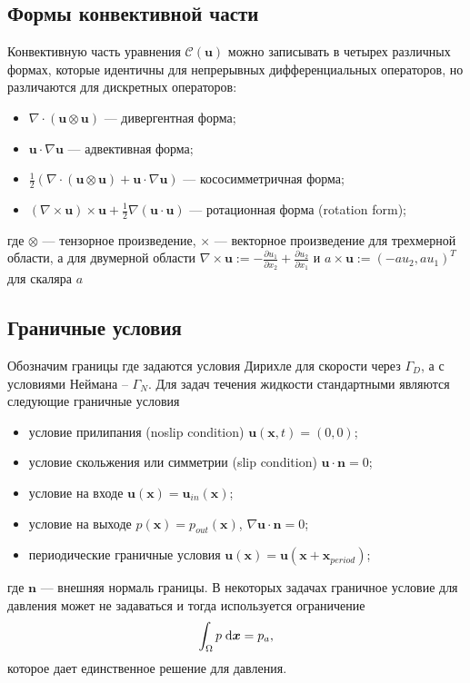 \documentclass[a4paper,10pt]{report}
\begin{document}
\subsection{Формы конвективной части}

Конвективную часть уравнения $\mathcal{C}(\bm{u})$ можно записывать в четырех различных формах, которые идентичны для непрерывных дифференциальных операторов, но различаются для дискретных операторов:
\begin{itemize}
\item $\nabla \cdot \left(\bm{u} \otimes \bm{u} \right)$ --- дивергентная форма;
\item $\bm{u} \cdot \nabla \bm{u}$ --- адвективная форма;
\item $\frac{1}{2}\left(\nabla \cdot \left(\bm{u} \otimes \bm{u} \right) + \bm{u} \cdot \nabla \bm{u} \right)$ --- кососимметричная форма;
\item $\left( \nabla \times \bm{u} \right) \times \bm{u} + \frac{1}{2} \nabla \left(\bm{u} \cdot \bm{u} \right) $ --- ротационная форма (rotation form);
\end{itemize}
где $\otimes$ --- тензорное произведение, $\times$ --- векторное произведение для трехмерной области, а для двумерной области $\nabla \times \bm{u} := -\frac{\partial u_1}{\partial x_2} + \frac{\partial u_2}{\partial x_1}$ и $a \times \bm{u} := (-a u_2, a u_1)^T$ для скаляра $a$


\subsection{Граничные условия}
Обозначим границы где задаются условия Дирихле для скорости через $\Gamma_D$, а с условиями Неймана -- $\Gamma_N$. Для задач течения жидкости стандартными являются следующие граничные условия
\begin{itemize}
\item условие прилипания (noslip condition) $\bm{u}(\bm{x}, t) = (0, 0)$;
\item условие скольжения или симметрии (slip condition) $\bm{u} \cdot \bm{n} = 0$;
\item условие на входе $\bm{u}(\bm{x}) = \bm{u}_{in}(\bm{x})$;
\item условие на выходе $p(\bm{x}) = p_{out}(\bm{x})$, $\nabla \bm{u} \cdot \bm{n} = 0$;
\item периодические граничные условия $\bm{u}(\bm{x}) = \bm{u}(\bm{x} + \bm{x}_{period})$;
\end{itemize}
где $\bm{n}$ --- внешняя нормаль границы. В некоторых задачах граничное условие для давления может не задаваться и тогда используется ограничение 
\begin{equation}
\int_\Omega p \; {\rm d}\bm{x} = p_{a},
\label{eq:constrain}
\end{equation}
которое дает единственное решение для давления.
\end{document}
